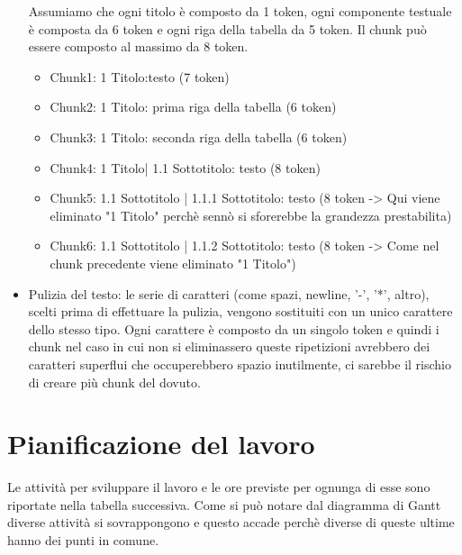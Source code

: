 \begin{itemize}
    Assumiamo che ogni titolo è composto da 1 token, ogni componente testuale è composta da 6 token e ogni riga della tabella da 5 token. Il chunk può essere composto al massimo da 8 token.
    \begin{tcolorbox}[colback=white, colframe=black]
        \begin{itemize}
            \item Chunk1: 1 Titolo:testo (7 token)
            \item Chunk2: 1 Titolo: prima riga della tabella (6 token)
            \item Chunk3: 1 Titolo: seconda riga della tabella (6 token)
            \item Chunk4: 1 Titolo| 1.1 Sottotitolo: testo (8 token)
            \item Chunk5: 1.1 Sottotitolo | 1.1.1 Sottotitolo: testo (8 token -> Qui viene eliminato "1 Titolo" perchè sennò si sforerebbe la grandezza prestabilita)
            \item Chunk6: 1.1 Sottotitolo | 1.1.2 Sottotitolo: testo (8 token -> Come nel chunk precedente viene eliminato "1 Titolo")
        \end{itemize}
    \end{tcolorbox}
    
    \item Pulizia del testo: le serie di caratteri  (come spazi, newline, '-', '*', altro), scelti prima di effettuare la pulizia, vengono sostituiti con un unico carattere dello stesso tipo.
    \noindent Ogni carattere è composto da un singolo token e quindi i chunk nel caso in cui non si eliminassero queste ripetizioni avrebbero dei caratteri superflui che occuperebbero spazio inutilmente, ci sarebbe il rischio di creare più chunk del dovuto.  
\end{itemize}

\section{Pianificazione del lavoro}
Le attività per sviluppare il lavoro e le ore previste per ognunga di esse sono riportate nella tabella successiva.
Come si può notare dal diagramma di Gantt diverse attività si sovrappongono e questo accade perchè diverse di queste ultime hanno dei punti in comune. 


